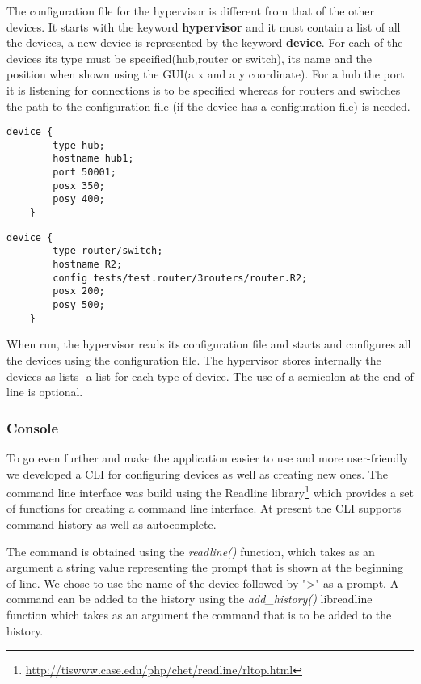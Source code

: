 {{The configuration file for the hypervisor is different from that of the other devices. It starts with the keyword \textbf{hypervisor} and it must contain a list of all the devices, a new device is represented by the keyword \textbf{device}. For each of the devices its type must be specified(hub,router or switch), its name and the position when shown using the GUI(a x and a y coordinate). For a hub the port it is listening for connections is to be specified whereas for routers and switches the path to the configuration file (if the device has a configuration file) is needed.    
\lstset{language=zsh,caption=Listing a Hub in hypervisor configuration file,label=lst:hy-config-file}
\begin{lstlisting}
device {
		type hub;
		hostname hub1;
		port 50001;
		posx 350;
		posy 400;
	}
\end{lstlisting}
\lstset{language=TeX,caption=Listing a Router/Switch in hypervisor configuration file,label=lst:hy-config-file}
\begin{lstlisting}
device {
		type router/switch;
		hostname R2;
		config tests/test.router/3routers/router.R2;
		posx 200;
		posy 500;
	}
\end{lstlisting}
When run, the hypervisor reads its configuration file and starts and configures all the devices using the configuration file.
The hypervisor stores internally the devices as lists -a list for each type of device. 
The use of a semicolon at the end of line is optional.  
\subsubsection*{Console}
\label{subsubsec:impl-console}
To go even further and make the application easier to use and more user-friendly we developed a CLI for configuring devices as well as creating new ones. The command line interface was build using the Readline library\footnote{\url{http://tiswww.case.edu/php/chet/readline/rltop.html}} which provides a set of functions for creating a command line interface. At present the CLI supports command history as well as autocomplete. 

The command is obtained using the \textit{readline()} function, which takes as an argument a string value representing the prompt that is shown at the beginning of line. We chose to use the name of the device followed by ">" as a prompt. A command can be added to the history using the \textit{add_history()} libreadline function which takes as an argument the command that is to be added to the history.

}}
